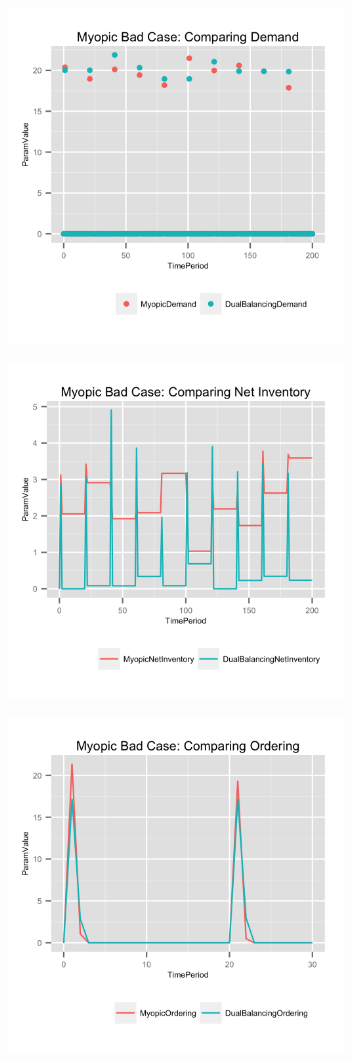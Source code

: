 \documentclass{beamer}
\begin{document}
\begin{frame}
  \includegraphics[height=3.5in]{figures/MyopicBadDemand.png}
\end{frame}

\begin{frame}
  \includegraphics[height=3.5in]{figures/MyopicBadNetInventory.png}
\end{frame}

\begin{frame}
  \includegraphics[height=3.5in]{figures/MyopicBadOrdering.png}
\end{frame}
\end{document}
